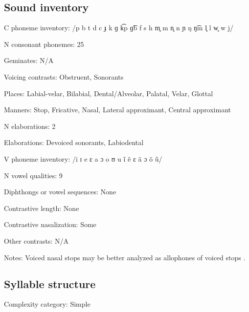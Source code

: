 {\subsection*{Sound inventory}
\begin{appendixdesc}

\item[C phoneme inventory:] /p b t d c ɟ k ɡ k͡p ɡ͡b f s h m̥ m n̥ n ɲ ŋ ŋ͡m l̥ l w̥ w j/

\item[N consonant phonemes:] 25

\item[Geminates:] N/A

\item[Voicing contrasts:] Obstruent, Sonorants

\item[Places:] Labial-velar, Bilabial, Dental/Alveolar, Palatal, Velar, Glottal

\item[Manners:] Stop, Fricative, Nasal, Lateral approximant, Central approximant

\item[N elaborations:] 2

\item[Elaborations:] Devoiced sonorants, Labiodental

\item[V phoneme inventory:] /i ɪ e ɛ a ɔ o ʊ u ĩ ẽ ɛ ã ɔ õ ũ/

\item[N vowel qualities:] 9

\item[Diphthongs or vowel sequences:] None

\item[Contrastive length:] None

\item[Contrastive nasalization:] Some

\item[Other contrasts:] N/A

\item[Notes:] Voiced nasal stops may be better analyzed as allophones of voiced stops \citep[176]{Newman1986}.
\end{appendixdesc}
\subsection*{Syllable structure}
\begin{appendixdesc}

\item[Complexity category:] Simple


\end{appendixdesc}}
